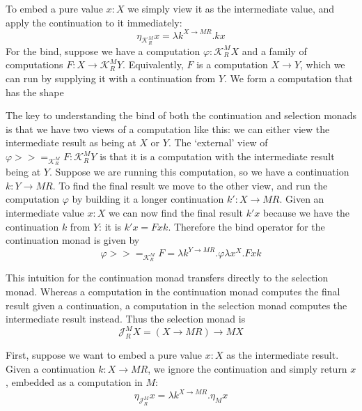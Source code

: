 \documentclass{article}
\newcommand\J{\mathscr J}
\newcommand\K{\mathscr K}
\newcommand\bind{>\!\!>\!\!=}
\begin{document}
To embed a pure value $x : X$ we simply view it as the intermediate value, and apply the continuation to it immediately:
\[ \eta_{\K^M_R} x = \lambda k^{X \to MR} . kx \]
For the bind, suppose we have a computation $\varphi : \K^M_R X$ and a family of computations $F : X \to \K^M_R Y$. Equivalently, $F$ is a computation $X \to Y$, which we can run by supplying it with a continuation from $Y$. We form a computation that has the shape
\begin{center}\end{center}
The key to understanding the bind of both the continuation and selection monads is that we have two views of a computation like this: we can either view the intermediate result as being at $X$ or $Y$. The `external' view of $\varphi \bind_{\K^M_R} F : \K^M_R Y$ is that it is a computation with the intermediate result being at $Y$. Suppose we are running this computation, so we have a continuation $k : Y \to MR$. To find the final result we move to the other view, and run the computation $\varphi$ by building it a longer continuation $k' : X \to MR$. Given an intermediate value $x : X$ we can now find the final result $k'x$ because we have the continuation $k$ from $Y$: it is $k'x = Fxk$. Therefore the bind operator for the continuation monad is given by
\[ \varphi \bind_{\K^M_R} F = \lambda k^{Y \to MR} . \varphi \lambda x^X . Fxk \]

This intuition for the continuation monad transfers directly to the selection monad. Whereas a computation in the continuation monad computes the final result given a continuation, a computation in the selection monad computes the intermediate result instead. Thus the selection monad is
\[ \J^M_R X = (X \to MR) \to MX \]

First, suppose we want to embed a pure value $x : X$ as the intermediate result. Given a continuation $k : X \to MR$, we ignore the continuation and simply return $x$, embedded as a computation in $M$:
\[ \eta_{\J^M_R} x = \lambda k^{X \to MR} . \eta_M x \]
\end{document}
